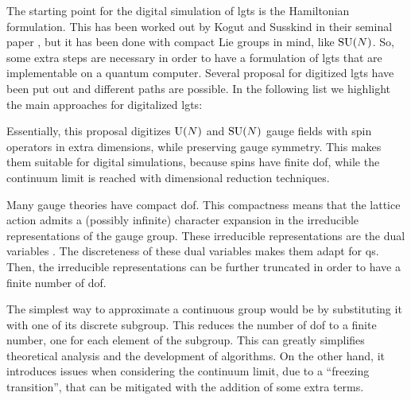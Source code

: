 The starting point for the digital simulation of \acp{lgt} is the Hamiltonian formulation.
This has been worked out by Kogut and Susskind in their seminal paper \cite{kogut1975hamiltonian}, but it has been done with compact Lie groups in mind, like $\text{SU}(N)$.
So, some extra steps are necessary in order to have a formulation of \acp{lgt} that are implementable on a quantum computer.
Several proposal for digitized \acp{lgt} have been put out
\cite{zohar2015latticegauge, zohar2017digital, zohar2017z2gauge, milstead2018qyangmills, bender2018lgt3d, cui2020circuit, byrnes2006lgt, chandrasekharan1997linkmodels, hackett2019lgt, lamm2019lgt}
and different paths are possible.
In the following list we highlight the main approaches for digitalized \acp{lgt}:
\begin{description}[labelsep=1.1em]
    \item[Quantum Link Models]
        Essentially, this proposal \cite{chandrasekharan1997linkmodels, brower1999linkmodel} digitizes $\mathrm{U}(N)$ and $\text{SU}(N)$ gauge fields with spin operators in extra dimensions, while preserving gauge symmetry.
        This makes them suitable for digital simulations, because spins have finite \ac{dof}, while the continuum limit is reached with dimensional reduction techniques.

    \item[Dual variables]
        Many gauge theories have compact \ac{dof}.
        This compactness means that the lattice action admits a (possibly infinite) character expansion in the irreducible representations of the gauge group.
        These irreducible representations are the dual variables \cite{savit1980duality, kaplan2020lgt}.
        The discreteness of these dual variables makes them adapt for \ac{qs}.
        Then, the irreducible representations can be further truncated in order to have a finite number of \ac{dof}.

    \item[Finite subgroups]
        The simplest way to approximate a continuous group would be by substituting it with one of its discrete subgroup.
        This reduces the number of \ac{dof} to a finite number, one for each element of the subgroup.
        This can greatly simplifies theoretical analysis \cite{fradkin1979phase} and the development of algorithms\citneeded.
        On the other hand, it introduces issues when considering the continuum limit, due to a ``freezing transition''\citneeded, that can be mitigated with the addition of some extra terms\citneeded.

\end{description}

